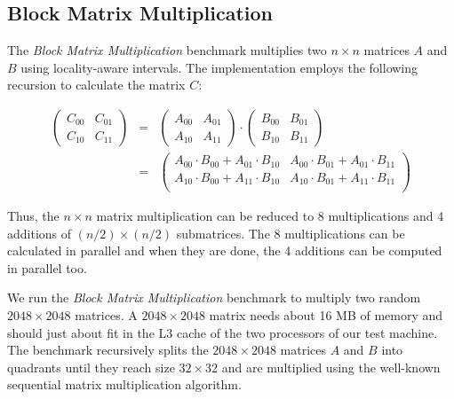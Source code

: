 
\subsection{Block Matrix Multiplication}
\label{sec:locality-performance-block-matrix-multiplication}

The \emph{Block Matrix Multiplication} benchmark multiplies two $n
\times n$ matrices $A$ and $B$ using locality-aware intervals. The
implementation employs the following recursion to calculate the matrix
$C$:

\begin{eqnarray*}
  \begin{pmatrix}
    C_{00} & C_{01} \\
    C_{10} & C_{11}
  \end{pmatrix}
  &
  =
  &
  \begin{pmatrix}
    A_{00} & A_{01} \\
    A_{10} & A_{11}
  \end{pmatrix}
  \cdot
  \begin{pmatrix}
    B_{00} & B_{01} \\
    B_{10} & B_{11}
  \end{pmatrix}
  \\
  &
  =
  &
  \begin{pmatrix}
    A_{00} \cdot B_{00} + A_{01} \cdot B_{10} & A_{00} \cdot B_{01} + A_{01} \cdot B_{11} \\
    A_{10} \cdot B_{00} + A_{11} \cdot B_{10} & A_{10} \cdot B_{01} + A_{11} \cdot B_{11} \\
  \end{pmatrix}
\end{eqnarray*}

Thus, the $n \times n$ matrix multiplication can be reduced to 8
multiplications and 4 additions of $(n/2) \times (n/2)$
submatrices. The 8 multiplications can be calculated in parallel and
when they are done, the 4 additions can be computed in parallel too.

We run the \emph{Block Matrix Multiplication} benchmark to multiply
two random $2048 \times 2048$ matrices. A $2048 \times 2048$ matrix
needs about 16 MB of memory and should just about fit in the L3 cache
of the two processors of our test machine. The benchmark recursively
splits the $2048 \times 2048$ matrices $A$ and $B$ into quadrants
until they reach size $32 \times 32$ and are multiplied using the
well-known sequential matrix multiplication algorithm.


